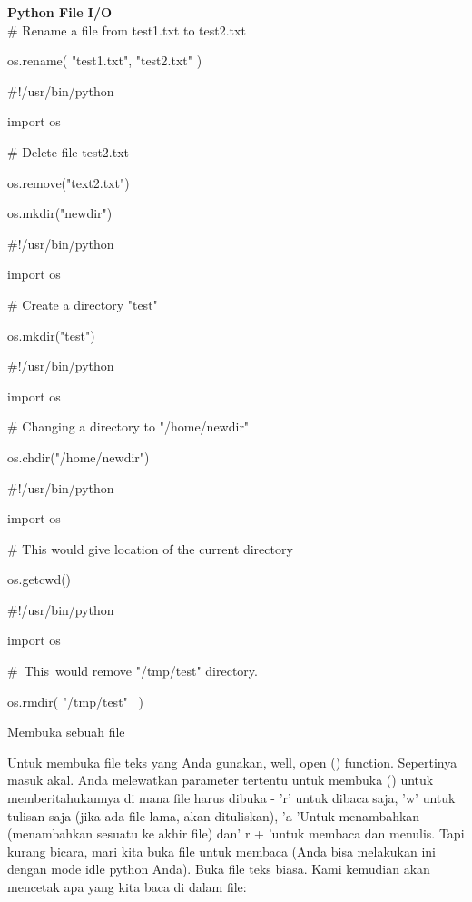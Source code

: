 \begin{center}{\fontsize{24pt}{24pt}\selectfont \textbf{Python File I/O} \\}
 $  \#  $ Rename a file from test1.txt to test2.txt 
 
os.rename( "test1.txt", "test2.txt" ) 
\vspace{14pt}

 $  \#  $!/usr/bin/python 
 
import os 
\vspace{12pt}
 
 $  \#  $ Delete file test2.txt 
 
os.remove("text2.txt") 
\vspace{14pt}
 
os.mkdir("newdir") 
\vspace{14pt}

 $  \#  $!/usr/bin/python 
 
import os 
\vspace{12pt}

 $  \#  $ Create a directory "test" 
 
os.mkdir("test") 
\vspace{14pt}

 $  \#  $!/usr/bin/python 
 
import os 
\vspace{12pt}
 
 $  \#  $ Changing a directory to "/home/newdir" 
 
os.chdir("/home/newdir") 
\vspace{14pt}

 $  \#  $!/usr/bin/python 
 
import os
\vspace{12pt}

 $  \#  $ This would give location of the current directory 
 
os.getcwd() 
\vspace{14pt}
 
 $  \#  $!/usr/bin/python 

import os 
\vspace{12pt}

 $  \#  $~This~would  remove "/tmp/test"  directory. 
 
os.rmdir( "/tmp/test"~ ) 
\vspace{14pt}
\vspace{14pt}
 
Membuka sebuah file 

\vspace{12pt}

Untuk membuka file teks yang Anda gunakan, well, open () function. Sepertinya masuk akal. Anda melewatkan parameter tertentu untuk membuka () untuk memberitahukannya di mana file harus dibuka - 'r' untuk dibaca saja, 'w' untuk tulisan saja (jika ada file lama, akan dituliskan), 'a 'Untuk menambahkan (menambahkan sesuatu ke akhir file) dan' r + 'untuk membaca dan menulis. Tapi kurang bicara, mari kita buka file untuk membaca (Anda bisa melakukan ini dengan mode idle python Anda). Buka file teks biasa. Kami kemudian akan mencetak apa yang kita baca di dalam file: 


\end{center}
